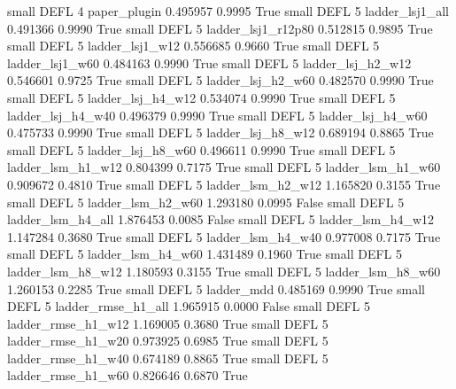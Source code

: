      small     DEFL                 4             paper_plugin   0.495957      0.9995    True
     small     DEFL                 5          ladder_lsj1_all   0.491366      0.9990    True
     small     DEFL                 5       ladder_lsj1_r12p80   0.512815      0.9895    True
     small     DEFL                 5          ladder_lsj1_w12   0.556685      0.9660    True
     small     DEFL                 5          ladder_lsj1_w60   0.484163      0.9990    True
     small     DEFL                 5        ladder_lsj_h2_w12   0.546601      0.9725    True
     small     DEFL                 5        ladder_lsj_h2_w60   0.482570      0.9990    True
     small     DEFL                 5        ladder_lsj_h4_w12   0.534074      0.9990    True
     small     DEFL                 5        ladder_lsj_h4_w40   0.496379      0.9990    True
     small     DEFL                 5        ladder_lsj_h4_w60   0.475733      0.9990    True
     small     DEFL                 5        ladder_lsj_h8_w12   0.689194      0.8865    True
     small     DEFL                 5        ladder_lsj_h8_w60   0.496611      0.9990    True
     small     DEFL                 5        ladder_lsm_h1_w12   0.804399      0.7175    True
     small     DEFL                 5        ladder_lsm_h1_w60   0.909672      0.4810    True
     small     DEFL                 5        ladder_lsm_h2_w12   1.165820      0.3155    True
     small     DEFL                 5        ladder_lsm_h2_w60   1.293180      0.0995   False
     small     DEFL                 5        ladder_lsm_h4_all   1.876453      0.0085   False
     small     DEFL                 5        ladder_lsm_h4_w12   1.147284      0.3680    True
     small     DEFL                 5        ladder_lsm_h4_w40   0.977008      0.7175    True
     small     DEFL                 5        ladder_lsm_h4_w60   1.431489      0.1960    True
     small     DEFL                 5        ladder_lsm_h8_w12   1.180593      0.3155    True
     small     DEFL                 5        ladder_lsm_h8_w60   1.260153      0.2285    True
     small     DEFL                 5               ladder_mdd   0.485169      0.9990    True
     small     DEFL                 5       ladder_rmse_h1_all   1.965915      0.0000   False
     small     DEFL                 5       ladder_rmse_h1_w12   1.169005      0.3680    True
     small     DEFL                 5       ladder_rmse_h1_w20   0.973925      0.6985    True
     small     DEFL                 5       ladder_rmse_h1_w40   0.674189      0.8865    True
     small     DEFL                 5       ladder_rmse_h1_w60   0.826646      0.6870    True
